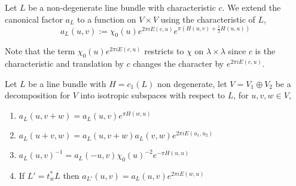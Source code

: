 \begin{paragraph}{}
\begin{definition}
Let $L$ be a non-degenerate line bundle with characteristic $c$. We extend the canonical factor $a_L$ to a function on $V\times V$ using the characteristic of $L$, 
\begin{equation*}
a_L(u,v):=\chi_0(u) e^{2\pi i E(c,u)} e^{\pi(H(u,v)+\frac{1}{2} H(u,u))}
\end{equation*}
\end{definition}
Note that the term $\chi_0(u) e^{2\pi i E(c,u)}$ restricts to $\chi$ on $\lambda\times \lambda$ since $c$ is the characteristic and translation by $c$ changes the character by $e^{2\pi i E(c,u)}$. 
\begin{proposition}\label{thelemma}
Let $L$ be a line bundle with $H=c_1(L)$ non degenerate, let $V=V_1\oplus V_2$ be a decomposition for $V$ into isotropic subspaces with respect to $L$, for $u,v,w\in V$,
\begin{enumerate}
\item $a_L(u,v+w)= a_L(u,v) e^{\pi H(w,u)}$
\item $a_L(u+v,w)=a_L(u,v+w) a_L(v,w) e^{2\pi i E(u_1, u_2)}$
\item $a_L(u,v)^{-1}= a_L(-u,v) \chi_0(u)^{-2} e^{-\pi H(u,u)}$
\item If $L'=t_w^* L$ then $a_{L'}(u,v)=a_L(u,v)e^{2\pi i E(w,u)}$
\end{enumerate}


\end{proposition}
\end{paragraph}
